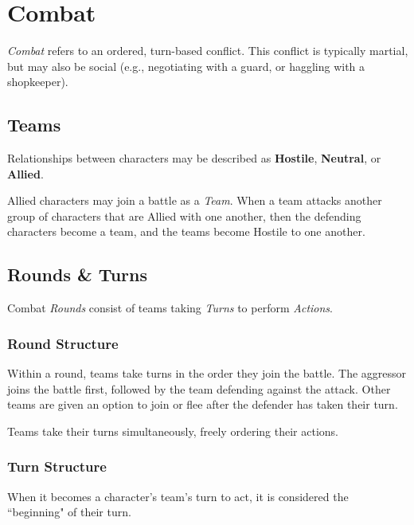 
\chapter{Combat}



\textit{Combat} refers to an ordered, turn-based conflict. 
This conflict is typically martial, 
but may also be social (e.g., negotiating with a guard, 
or haggling with a shopkeeper).



\section{Teams}
 Relationships between characters may be described as \textbf{Hostile}, 
 \textbf{Neutral}, or \textbf{Allied}.

\vspace{0.4em}

 Allied characters may join a battle as a \textit{Team}.
 When a team attacks another group of characters that are Allied with one another, 
 then the defending characters become a team, and the teams become Hostile to one another.



\section{Rounds \& Turns}
Combat \textit{Rounds} consist of teams taking \textit{Turns} 
to perform \textit{Actions}.


\subsection{Round Structure}
Within a round, teams take turns in the order they join the battle. 
The aggressor joins the battle first, 
followed by the team defending against the attack.
Other teams are given an option to join or flee after the defender 
has taken their turn.

\vspace{0.4em}

Teams take their turns simultaneously, freely ordering their actions.


\subsection{Turn Structure}
When it becomes a character's team's turn to act, 
it is considered the ``beginning" of their turn.

